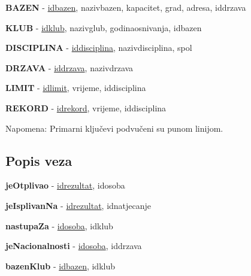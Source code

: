 \documentclass[times, utf8, zavrsni]{fer}
\begin{document}
\vspace{\baselineskip}

\textbf{BAZEN} - \underline{idbazen}, nazivbazen, kapacitet, grad, adresa, iddrzava

\vspace{\baselineskip}

\textbf{KLUB} - \underline{idklub}, nazivglub, godinaosnivanja, idbazen

\vspace{\baselineskip}

\textbf{DISCIPLINA} - \underline{iddisciplina}, nazivdisciplina, spol

\vspace{\baselineskip}

\textbf{DRZAVA} - \underline{iddrzava}, nazivdrzava

\vspace{\baselineskip}

\textbf{LIMIT} - \underline{idlimit}, vrijeme, iddisciplina

\vspace{\baselineskip}

\textbf{REKORD} - \underline{idrekord}, vrijeme, iddisciplina

\vspace{\baselineskip}

Napomena: Primarni ključevi podvučeni su punom linijom.

\subsection{Popis veza}

\hspace*{0.6cm}\textbf{jeOtplivao} - \underline{idrezultat}, idosoba

\vspace{\baselineskip}

\textbf{jeIsplivanNa} - \underline{idrezultat}, idnatjecanje

\vspace{\baselineskip}

\textbf{nastupaZa} - \underline{idosoba}, idklub

\vspace{\baselineskip}

\textbf{jeNacionalnosti} - \underline{idosoba}, iddrzava

\vspace{\baselineskip}

\textbf{bazenKlub} - \underline{idbazen}, idklub
\end{document}
